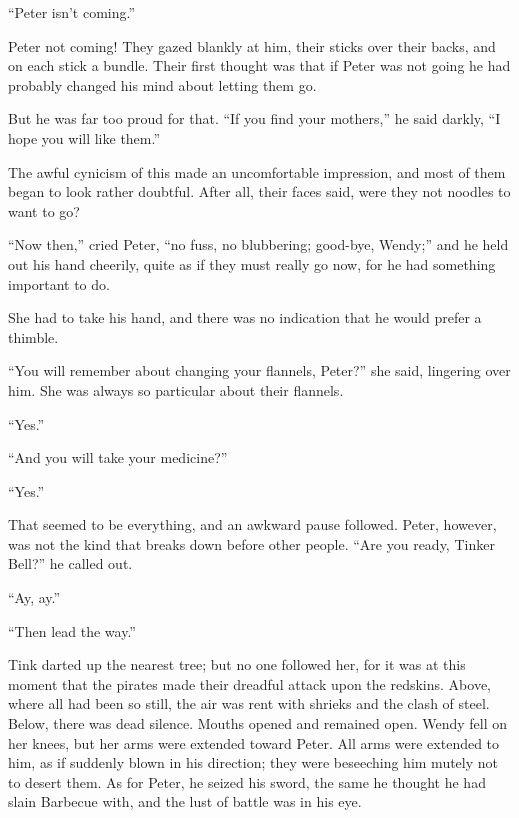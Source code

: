 ``Peter isn't coming.''

Peter not coming! They gazed blankly at him, their sticks over their
backs, and on each stick a bundle. Their first thought was that if
Peter was not going he had probably changed his mind about letting them
go.

But he was far too proud for that. ``If you find your mothers,'' he said
darkly, ``I hope you will like them.''

The awful cynicism of this made an uncomfortable impression, and most
of them began to look rather doubtful. After all, their faces said,
were they not noodles to want to go?

``Now then,'' cried Peter, ``no fuss, no blubbering; good-bye, Wendy;'' and
he held out his hand cheerily, quite as if they must really go now, for
he had something important to do.

She had to take his hand, and there was no indication that he would
prefer a thimble.

``You will remember about changing your flannels, Peter?'' she said,
lingering over him. She was always so particular about their flannels.

``Yes.''

``And you will take your medicine?''

``Yes.''

That seemed to be everything, and an awkward pause followed. Peter,
however, was not the kind that breaks down before other people. ``Are
you ready, Tinker Bell?'' he called out.

``Ay, ay.''

``Then lead the way.''

Tink darted up the nearest tree; but no one followed her, for it was at
this moment that the pirates made their dreadful attack upon the
redskins. Above, where all had been so still, the air was rent with
shrieks and the clash of steel. Below, there was dead silence. Mouths
opened and remained open. Wendy fell on her knees, but her arms were
extended toward Peter. All arms were extended to him, as if suddenly
blown in his direction; they were beseeching him mutely not to desert
them. As for Peter, he seized his sword, the same he thought he had
slain Barbecue with, and the lust of battle was in his eye.
